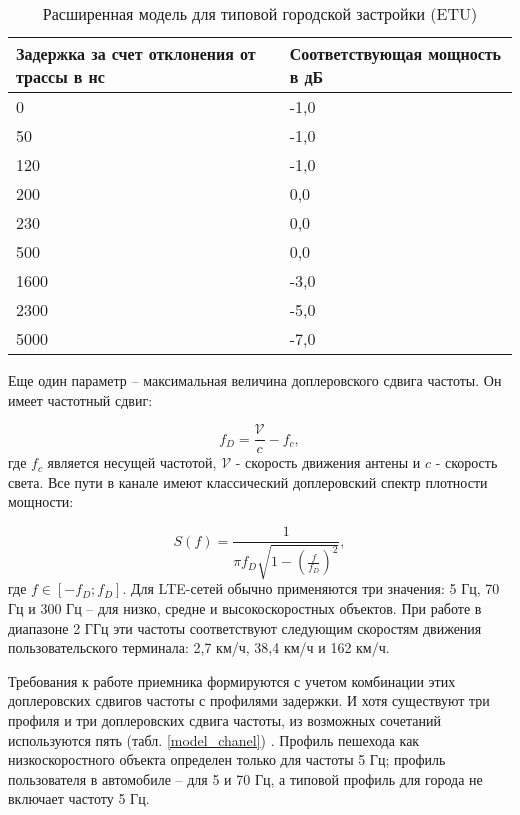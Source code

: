 \begin{table} [htb]
  \centering
\parbox{15cm}{\caption{Расширенная модель для типовой городской застройки (ETU)}\label{ETU}}
\begin{tabular}{|p{7cm}|p{7cm}|}
    \hline
    \hline
    Задержка за счет отклонения от трассы в нс &  Соответствующая мощность в дБ \\ \hline \hline
    0    & -1,0 \\ \hline
    50   & -1,0 \\ \hline
    120  & -1,0 \\ \hline
    200  & 0,0  \\ \hline
    230  & 0,0  \\ \hline
    500  & 0,0  \\ \hline
    1600 & -3,0 \\ \hline
    2300 & -5,0 \\ \hline
    5000 & -7,0 \\ \hline
    \end{tabular}
\end{table}






Еще один параметр – максимальная величина доплеровского сдвига частоты. Он имеет частотный сдвиг:

\begin{equation}\label{eq:maxDeltaF}
f_{D}=\frac{\mathcal{V}}{c}-f_{c},
\end{equation}
\noindent где $f_{c}$ является несущей частотой, $\mathcal{V}$ - скорость движения антены и $c$ - скорость света. Все пути в канале имеют классический доплеровский спектр плотности мощности:

\begin{equation}\label{eq:maxDeltaF1}
S(f)=\frac{1}{\pi f_D \sqrt{1-(\frac{f}{f_D})^2}},
\end{equation}
\noindent где $f\in [-f_D;f_D]$. Для LTE-сетей обычно применяются три значения: 5 Гц, 70 Гц и 300 Гц – для низко, средне и высокоскоростных объектов. 
При работе в диапазоне 2 ГГц эти частоты соответствуют следующим скоростям движения пользовательского терминала: 2,7 км/ч, 38,4 км/ч и 162 км/ч. 

Требования к работе приемника формируются с учетом комбинации этих доплеровских сдвигов частоты с профилями задержки. 
И хотя существуют три профиля и три доплеровских сдвига частоты, из возможных сочетаний используются пять (табл. \ref{model_chanel}) \cite{iks}. 
Профиль пешехода как низкоскоростного объекта определен только для частоты 5 Гц; профиль пользователя в автомобиле – для 5 и 70 Гц, а типовой профиль для города не включает частоту 5 Гц.






